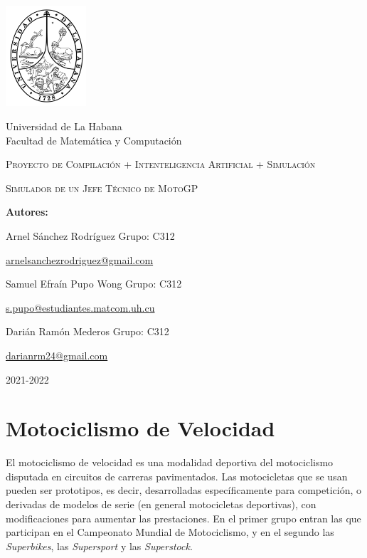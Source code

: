 \documentclass[12pt, letterpaper,spanish]{article}
\theoremstyle{definition}
\theoremstyle{remark}
\begin{document}
	
\begin{titlepage}
	\begin{center}
		\includegraphics[width = 3cm]{escudoUH} 
	\end{center}
	\begin{center}
		Universidad de La Habana \\\vspace{0.2cm} Facultad de Matemática y Computación
	\end{center}
	\centering
	\vspace{1cm} \par
	{\scshape\Large Proyecto de Compilación + Intenteligencia Artificial + Simulación\par}
	\vspace{5mm} \par
	{\scshape\Huge Simulador de un Jefe Técnico de MotoGP\par}
	\vspace{5mm} \par
	\vfill
	{\Large \textbf{Autores:} \par}
	{\large Arnel Sánchez Rodríguez \space Grupo: C312 \par}
	\href{mailto:arnelsanchezrodriguez@gmail.com}{arnelsanchezrodriguez@gmail.com}\par
	\vspace{3mm} \par
	{\large Samuel Efraín Pupo Wong \space Grupo: C312 \par}
	\href{mailto:s.pupo@estudiantes.matcom.uh.cu}{s.pupo@estudiantes.matcom.uh.cu}
	\vspace{3mm} \par
	{\large Darián Ramón Mederos \space Grupo: C312 \par}
	\href{mailto:darianrm24@gmail.com}{darianrm24@gmail.com}
	\vspace{3mm} \par
	\vfill
	{\Large 2021-2022 \par}
\end{titlepage}	
\pagebreak
\tableofcontents
\pagebreak
\section{Motociclismo de Velocidad}
	El motociclismo de velocidad es una modalidad deportiva del motociclismo disputada en circuitos de carreras pavimentados. Las motocicletas que se usan pueden ser prototipos, es decir, desarrolladas específicamente para competición, o derivadas de modelos de serie (en general motocicletas deportivas), con modificaciones para aumentar las prestaciones. En el primer grupo entran las que participan en el Campeonato Mundial de Motociclismo, y en el segundo las \emph{Superbikes}, las \emph{Supersport} y las \emph{Superstock}.
	
\end{document}

